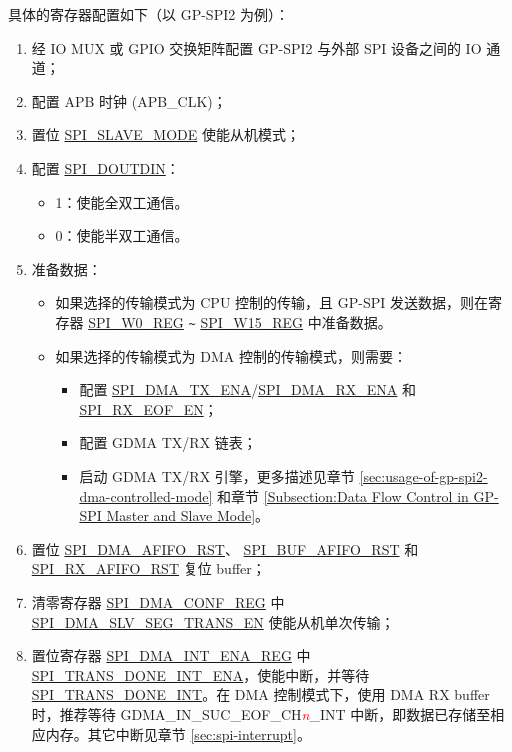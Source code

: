\documentclass[main\_\_CN.tex]{subfiles}
\begin{document}
具体的寄存器配置如下（以 GP-SPI2 为例）：
\begin{enumerate}
    \item 经 IO MUX 或 GPIO 交换矩阵配置 GP-SPI2 与外部 SPI 设备之间的 IO 通道；

    \item 配置 APB 时钟 (APB\_CLK)；

    \item 置位  \hyperref[fielddesc:SPISLAVEMODE]{SPI\_SLAVE\_MODE} 使能从机模式；

    \item 配置  \hyperref[fielddesc:SPIDOUTDIN]{SPI\_DOUTDIN}：
    \begin{itemize}
        \item 1：使能全双工通信。
        \item 0：使能半双工通信。
    \end{itemize}

    \item 准备数据：
    \begin{itemize}
        \item 如果选择的传输模式为 CPU 控制的传输，且 GP-SPI 发送数据，则在寄存器  \hyperref[regdesc:SPIW0REG]{SPI\_W0\_REG} \verb+~+ \hyperref[regdesc:SPIW15REG]{SPI\_W15\_REG} 中准备数据。
        \item 如果选择的传输模式为 DMA 控制的传输模式，则需要：
        \begin{itemize}
            \item 配置  \hyperref[fielddesc:SPIDMATXENA]{SPI\_DMA\_TX\_ENA}/\hyperref[fielddesc:SPIDMARXENA]{SPI\_DMA\_RX\_ENA} 和 \hyperref[fielddesc:SPIRXEOFEN]{SPI\_RX\_EOF\_EN}；
            \item 配置 GDMA TX/RX 链表；
            \item 启动 GDMA TX/RX 引擎，更多描述见章节  \ref{sec:usage-of-gp-spi2-dma-controlled-mode} 和章节  \ref{Subsection:Data Flow Control in GP-SPI Master and Slave Mode}。
        \end{itemize}
    \end{itemize}

    \item 置位  \hyperref[fielddesc:SPIDMAAFIFORST]{SPI\_DMA\_AFIFO\_RST}、 \hyperref[fielddesc:SPIBUFAFIFORST]{SPI\_BUF\_AFIFO\_RST} 和  \hyperref[fielddesc:SPIRXAFIFORST]{SPI\_RX\_AFIFO\_RST} 复位 buffer；

    \item 清零寄存器  \hyperref[regdesc:SPIDMACONFREG]{SPI\_DMA\_CONF\_REG} 中 \hyperref[fielddesc:SPIDMASLVSEGTRANSEN]{SPI\_DMA\_SLV\_SEG\_TRANS\_EN} 使能从机单次传输；

    \item 置位寄存器  \hyperref[regdesc:SPIDMAINTENAREG]{SPI\_DMA\_INT\_ENA\_REG} 中 \hyperref[fielddesc:SPITRANSDONEINTENA]{SPI\_TRANS\_DONE\_INT\_ENA}，使能中断，并等待 \hyperref[int:SPITRANSDONEINT]{SPI\_TRANS\_DONE\_INT}。在 DMA 控制模式下，使用 DMA RX buffer 时，推荐等待 GDMA\_IN\_SUC\_EOF\_CH\textcolor{red}{\it{n}}\_INT  中断，即数据已存储至相应内存。其它中断见章节  \ref{sec:spi-interrupt}。
\end{enumerate}
\end{document}
